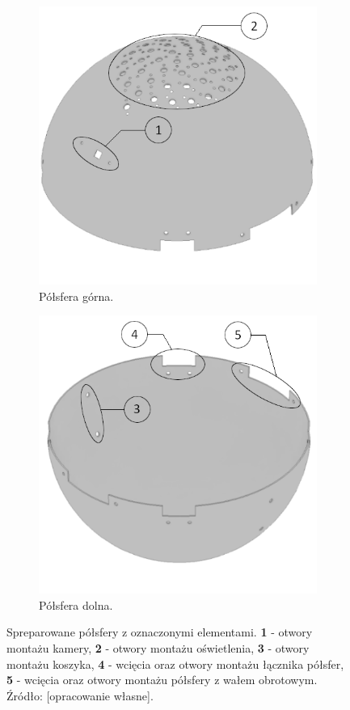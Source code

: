 \begin{figure}
	\centering
	
	\begin{subfigure}[b]{.49\textwidth}
			\centering
			\includegraphics[width=.6\textwidth]{top_half_marked}
			\caption{Półsfera górna.} 
			\label{fig:globus_top}
	\end{subfigure}
	\hfill%
	\begin{subfigure}[b]{.49\textwidth}
			\centering
			\includegraphics[width=.6\textwidth]{bot_half_marked}
			\caption{Półsfera dolna.} 
			\label{fig:globus_bot}
	\end{subfigure}
	\caption{Spreparowane półsfery z oznaczonymi elementami. \textbf{1} - otwory montażu kamery, \textbf{2} - otwory montażu oświetlenia, \textbf{3} - otwory montażu koszyka, \textbf{4} - wcięcia oraz otwory montażu łącznika półsfer, \textbf{5} - wcięcia oraz otwory montażu półsfery z wałem obrotowym. Źródło: [opracowanie własne].}
	\label{fig:globus}

\end{figure}

